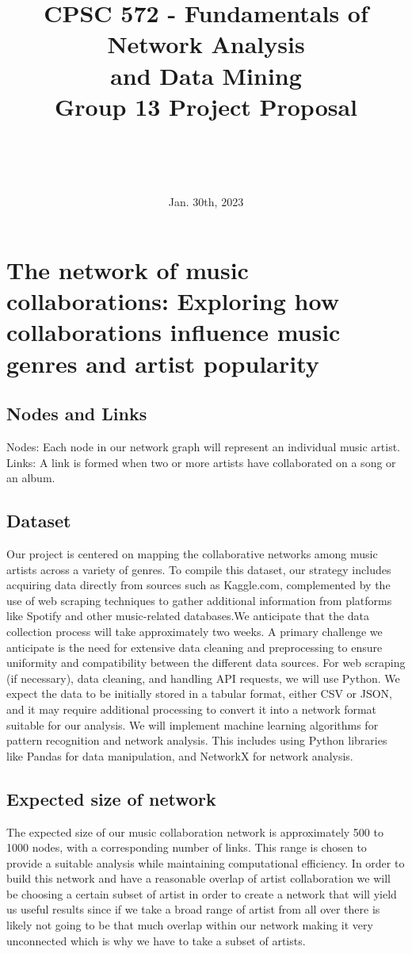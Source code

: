 \documentclass[10pt]{article}
\title{\vspace{3.0cm}CPSC 572 - Fundamentals of Network Analysis\\ and Data Mining \\ Group 13 Project Proposal}
\author{
      \Wasif \\
      \Haoyang\\ 
      \Ty\\ 
}
\date{Jan. 30th, 2023}
\begin{document}
\maketitle
\newpage
\section*{The network of music collaborations: Exploring how collaborations influence music genres and artist popularity}
\subsection*{Nodes and Links}
Nodes: Each node in our network graph will represent an individual music artist.\\
Links: A link is formed when two or more artists have collaborated on a song or an album.
\subsection*{Dataset}
Our project is centered on mapping the collaborative networks among music artists across a variety of genres. To compile this dataset, our strategy includes acquiring data directly from sources such as Kaggle.com, complemented by the use of web scraping techniques to gather additional information from platforms like Spotify and other music-related databases.We anticipate that the data collection process will take approximately two weeks. A primary challenge we anticipate is the need for extensive data cleaning and preprocessing to ensure uniformity and compatibility between the different data sources. For web scraping (if necessary), data cleaning, and handling API requests, we will use Python. We expect the data to be initially stored in a tabular format, either CSV or JSON, and it may require additional processing to convert it into a network format suitable for our analysis. We will implement machine learning algorithms for pattern recognition and network analysis. This includes using Python libraries like Pandas for data manipulation, and NetworkX for network analysis.

\subsection*{Expected size of network}
The expected size of our music collaboration network is approximately 500 to 1000 nodes, with a corresponding number of links. This range is chosen to provide a suitable analysis while maintaining computational efficiency. In order to build this network and have a reasonable overlap of artist collaboration we will be choosing a certain subset of artist in order to create a network that will yield us useful results since if we take a broad range of artist from all over there is likely not going to be that much overlap within our network making it very unconnected which is why we have to take a subset of artists.
\end{document}
